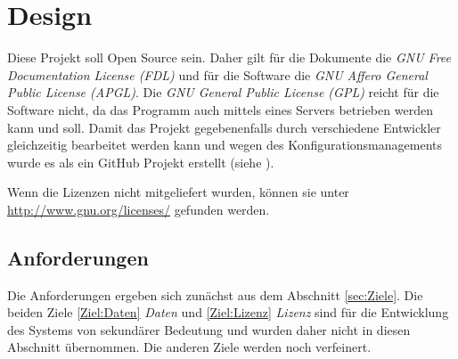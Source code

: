 \documentclass[english,ngerman,parskip=half,headsepline,footsepline]{scrreprt}
\begin{document}
	
	\chapter{Design}
	\thispagestyle{scrheadings}
	
	Diese Projekt soll Open Source sein. Daher gilt für die Dokumente die \emph{GNU Free Documentation License (FDL)} und für die Software die \emph{GNU Affero General Public License (APGL)}. Die \emph{GNU General Public License (GPL)} reicht für die Software nicht, da das Programm auch mittels eines Servers betrieben werden kann und soll. Damit das Projekt gegebenenfalls durch verschiedene Entwickler gleichzeitig bearbeitet werden kann und wegen des Konfigurationsmanagements wurde es als ein GitHub Projekt erstellt (siehe \cite{bib:ASBA}).
	
	Wenn die Lizenzen nicht mitgeliefert wurden, können sie unter \url{http://www.gnu.org/licenses/} gefunden werden.
	
	\section{Anforderungen}
	\label{Anforderungen}

	Die Anforderungen ergeben sich zunächst aus dem Abschnitt \vref{sec:Ziele}. Die beiden Ziele \ref{Ziel:Daten} \emph{Daten} und \ref{Ziel:Lizenz} \emph{Lizenz} sind für die Entwicklung des Systems von sekundärer Bedeutung und wurden daher nicht in diesen Abschnitt übernommen. Die anderen Ziele werden noch verfeinert.
	
\end{document}
